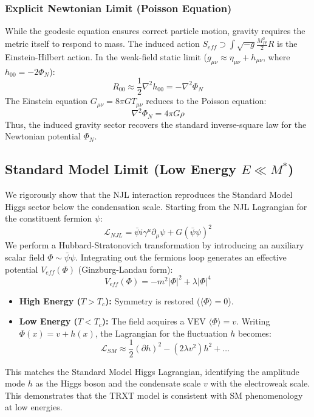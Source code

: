 \documentclass[a4paper,12pt]{article}
\begin{document}
\subsubsection{Explicit Newtonian Limit (Poisson Equation)}
While the geodesic equation ensures correct particle motion, gravity requires the metric itself to respond to mass.
The induced action $S_{eff} \supset \int \sqrt{-g} \frac{M_{Pl}^2}{2} R$ is the Einstein-Hilbert action.
In the weak-field static limit ($g_{\mu\nu} \approx \eta_{\mu\nu} + h_{\mu\nu}$, where $h_{00} = -2\Phi_N$):
\begin{equation}
    R_{00} \approx \frac{1}{2} \nabla^2 h_{00} = -\nabla^2 \Phi_N
\end{equation}
The Einstein equation $G_{\mu\nu} = 8\pi G T_{\mu\nu}$ reduces to the Poisson equation:
\begin{equation}
    \nabla^2 \Phi_N = 4\pi G \rho
\end{equation}
Thus, the induced gravity sector recovers the standard inverse-square law for the Newtonian potential $\Phi_N$.

\subsection{Standard Model Limit (Low Energy $E \ll M^*$)}

We rigorously show that the NJL interaction reproduces the Standard Model Higgs sector below the condensation scale.
Starting from the NJL Lagrangian for the constituent fermion $\psi$:
\begin{equation}
    \mathcal{L}_{NJL} = \bar{\psi} i \gamma^\mu \partial_\mu \psi + G (\bar{\psi}\psi)^2
\end{equation}
We perform a Hubbard-Stratonovich transformation by introducing an auxiliary scalar field $\Phi \sim \bar{\psi}\psi$. Integrating out the fermions loop generates an effective potential $V_{eff}(\Phi)$ (Ginzburg-Landau form):
\begin{equation}
    V_{eff}(\Phi) = -m^2 |\Phi|^2 + \lambda |\Phi|^4
\end{equation}
\begin{itemize}
    \item \textbf{High Energy ($T > T_c$):} Symmetry is restored ($\langle \Phi \rangle = 0$).
    \item \textbf{Low Energy ($T < T_c$):} The field acquires a VEV $\langle \Phi \rangle = v$. Writing $\Phi(x) = v + h(x)$, the Lagrangian for the fluctuation $h$ becomes:
    \begin{equation}
        \mathcal{L}_{SM} \approx \frac{1}{2}(\partial h)^2 - (2\lambda v^2) h^2 + \dots
    \end{equation}
\end{itemize}
This matches the Standard Model Higgs Lagrangian, identifying the amplitude mode $h$ as the Higgs boson and the condensate scale $v$ with the electroweak scale. This demonstrates that the TRXT model is consistent with SM phenomenology at low energies.
\end{document}
